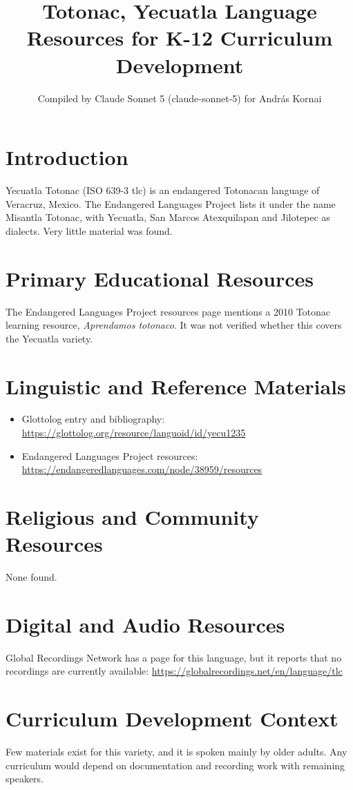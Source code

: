 \documentclass[12pt]{article}
\title{Totonac, Yecuatla Language Resources for K-12 Curriculum Development}
\author{Compiled by Claude Sonnet 5 (claude-sonnet-5) for Andr\'as Kornai}
\date{}
\begin{document}
\maketitle

\section{Introduction}
Yecuatla Totonac (ISO 639-3 tlc) is an endangered Totonacan language of Veracruz, Mexico. The Endangered Languages Project lists it under the name Misantla Totonac, with Yecuatla, San Marcos Atexquilapan and Jilotepec as dialects. Very little material was found.

\section{Primary Educational Resources}
The Endangered Languages Project resources page mentions a 2010 Totonac learning resource, \emph{Aprendamos totonaco}. It was not verified whether this covers the Yecuatla variety.

\section{Linguistic and Reference Materials}
\begin{itemize}
\item Glottolog entry and bibliography: \url{https://glottolog.org/resource/languoid/id/yecu1235}
\item Endangered Languages Project resources: \url{https://endangeredlanguages.com/node/38959/resources}
\end{itemize}

\section{Religious and Community Resources}
None found.

\section{Digital and Audio Resources}
Global Recordings Network has a page for this language, but it reports that no recordings are currently available: \url{https://globalrecordings.net/en/language/tlc}

\section{Curriculum Development Context}
Few materials exist for this variety, and it is spoken mainly by older adults. Any curriculum would depend on documentation and recording work with remaining speakers.
\end{document}
